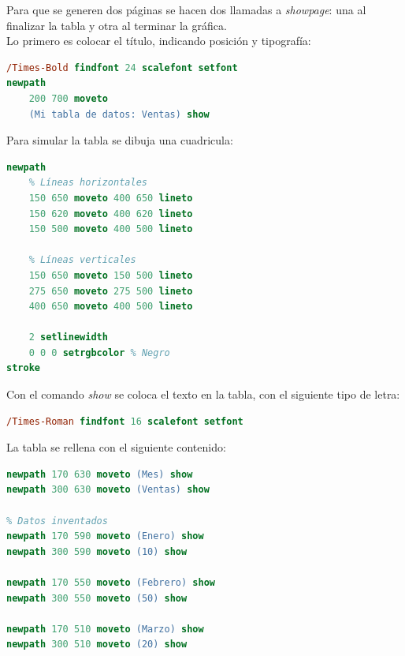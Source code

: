 
Para que se generen dos páginas se hacen dos llamadas a \textit{showpage}: una al finalizar la tabla y otra al terminar la gráfica.\\

Lo primero es colocar el título, indicando posición y tipografía:
\begin{lstlisting}[language=PostScript, caption=Titulo primera página, captionpos=b, label=fun:titulo]
/Times-Bold findfont 24 scalefont setfont
newpath
    200 700 moveto
    (Mi tabla de datos: Ventas) show
\end{lstlisting}

Para simular la tabla se dibuja una cuadricula:
\begin{lstlisting}[language=PostScript, caption=Cuadricula de la tabla, captionpos=b, label=fun:tabla]
newpath
    % Líneas horizontales
    150 650 moveto 400 650 lineto
    150 620 moveto 400 620 lineto
    150 500 moveto 400 500 lineto
    
    % Líneas verticales
    150 650 moveto 150 500 lineto
    275 650 moveto 275 500 lineto
    400 650 moveto 400 500 lineto
    
    2 setlinewidth 
    0 0 0 setrgbcolor % Negro
stroke
\end{lstlisting}

Con el comando \textit{show} se coloca el texto en la tabla, con el siguiente tipo de letra:
\begin{lstlisting}[language=PostScript, caption=Tipo de fuente, captionpos=b, label=fun:tipo]
/Times-Roman findfont 16 scalefont setfont
\end{lstlisting}

La tabla se rellena con el siguiente contenido:
\begin{lstlisting}[language=PostScript, caption=Relleno de la tabla, captionpos=b, label=fun:relleno]
% Cabeceras
newpath 170 630 moveto (Mes) show
newpath 300 630 moveto (Ventas) show

% Datos inventados
newpath 170 590 moveto (Enero) show
newpath 300 590 moveto (10) show

newpath 170 550 moveto (Febrero) show
newpath 300 550 moveto (50) show

newpath 170 510 moveto (Marzo) show
newpath 300 510 moveto (20) show
\end{lstlisting}

